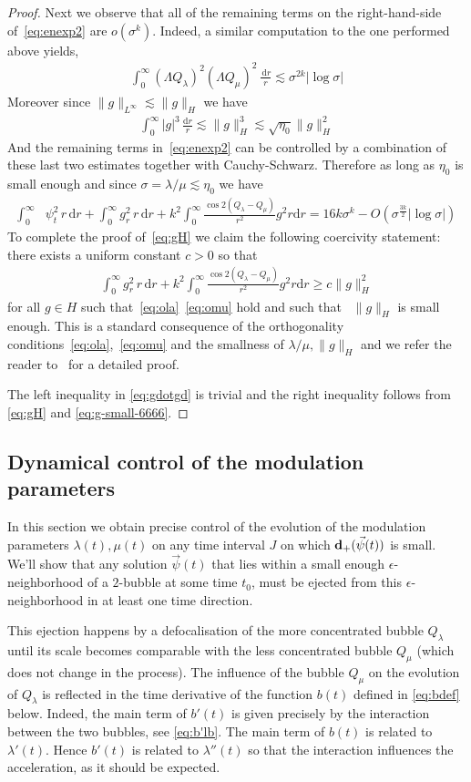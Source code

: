 \documentclass[10pt,reqno]{amsart}
\newcommand{\la}{\lambda}
\newcommand{\s}{\sigma}
\newcommand{\La}{\Lambda}
\newcommand{\I}{\infty}
\newcommand{\abs}[1]{\left\lvert{#1}\right\rvert}
\newcommand{\EQ}[1]{\begin{equation}\begin{split} #1 \end{split}\end{equation}}
\numberwithin{equation}{section}
\theoremstyle{remark}
\newcommand{\rdr}{ \, r \, \mathrm{d}r}
\newcommand{\dr}{\, \mathrm{d}r}
\newcommand{\ud}{\mathrm{d}}
\newcommand{\0}{\emptyset}
\newcommand{\eps}{\epsilon}
\newcommand{\bfd}{{\bf d}}
\begin{document}
\begin{proof}
Next we observe that all of the remaining terms on the right-hand-side of~\eqref{eq:enexp2} are $o( \s^{k})$. Indeed, a similar computation to the one performed above yields, 
\EQ{
\int_0^\I (\La Q_\la)^2 (\La Q_\mu)^2 \, \frac{\dr}{r} \lesssim \s^{2k} \abs{\log \s}
}
Moreover since $\|g \|_{L^\infty} \lesssim \|g \|_H$ %
we have 
\EQ{
\int_0^\infty \abs{g}^3 \, \frac{ \ud r}{r} \lesssim \|g\|_{H}^{3}   \lesssim  \sqrt{\eta_0} \| g\|_{H}^2 
}
And the remaining terms in~\eqref{eq:enexp2} can be controlled by a combination of these last two estimates together with Cauchy-Schwarz. Therefore as long as $\eta_0$ is small enough and since  $\s = \la/ \mu \lesssim \eta_0$ we have 
\EQ{ \label{eq:enexp3} 
\int_0^\infty &\psi_t^2\,   r \, \ud r +  \int_0^\infty g_r^2 \rdr + k^2 \int_0^{\infty}  \frac{ \cos 2(Q_\la - Q_\mu)}{r^2} g^2  r \ud r  = 16k \s^k - O( \s^{\frac{3k}{2} }\abs{\log \s})
}
To complete the proof of~\eqref{eq:gH} we claim the following coercivity statement: there exists a uniform constant  $c >0$ so that 
\EQ{ \label{eq:coercivity} 
 \int_0^\infty g_r^2 \rdr + k^2 \int_0^{\infty}  \frac{ \cos 2(Q_\la - Q_\mu)}{r^2} g^2  r \ud r  \ge c  \| g \|_H^2
}
for all $g \in H$ such that~\eqref{eq:ola}~\eqref{eq:omu} hold and such that ~$\|g \|_H$ is small enough. This is a standard consequence of the orthogonality conditions~\eqref{eq:ola},~\eqref{eq:omu} and the smallness of $\la/ \mu, \|g\|_H$ and we refer the reader to~\cite[Lemma 5.4]{JJ-AJM} for a detailed proof.

The left inequality in \eqref{eq:gdotgd} is trivial and the right inequality follows from \eqref{eq:gH} and \eqref{eq:g-small-6666}.
\end{proof} 


\subsection{Dynamical control of the modulation parameters}\label{s:modest} 

In this section we obtain precise control of the evolution of the modulation parameters $\la(t), \mu(t)$ on any time interval $J$ on which $\bfd_+(\vec \psi(t))$ is small. We'll show that any solution $\vec \psi(t)$ that lies within a small enough $\eps$-neighborhood of a $2$-bubble at some time $t_0$, must be ejected from this $\eps$-neighborhood in at least one time direction.

This ejection happens by a defocalisation of the more concentrated bubble $Q_\lambda$
until its scale becomes comparable with the less concentrated bubble $Q_\mu$
(which does not change in the process).
The influence of the bubble $Q_\mu$ on the evolution of $Q_\lambda$ is reflected
in the time derivative of the function $b(t)$ defined in \eqref{eq:bdef} below.
Indeed, the main term of $b'(t)$ is given precisely by the interaction between
the two bubbles, see \eqref{eq:b'lb}. 
The main term of $b(t)$ is related to $\lambda'(t)$.
Hence $b'(t)$ is related to $\lambda''(t)$
so that the interaction influences the acceleration,
as it should be expected.
\end{document}
